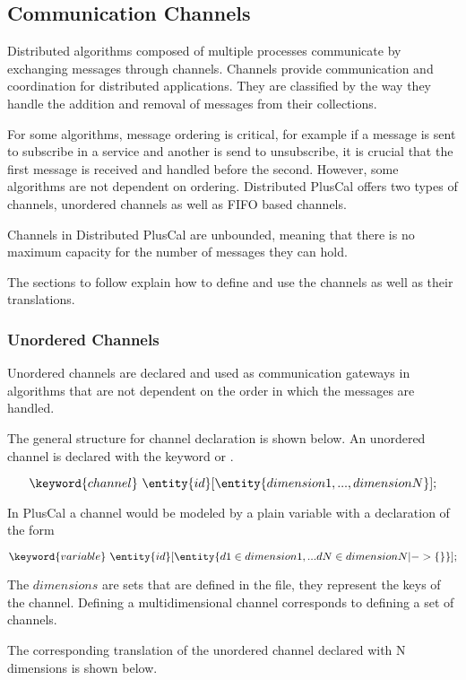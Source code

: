 \FloatBarrier
\subsection{Communication Channels}
\label{comChannels}

Distributed algorithms composed of multiple processes communicate by exchanging messages through channels. Channels provide communication and coordination for distributed applications. They are classified by the way they handle the addition and removal of messages from their collections. 

For some algorithms, message ordering is critical, for example if a message is sent to subscribe in a service and another is send to unsubscribe, it is crucial that the first message is received and handled before the second. However, some algorithms are not dependent on ordering. Distributed PlusCal offers two types of channels, unordered channels as well as FIFO based channels.

Channels in Distributed PlusCal are unbounded, meaning that there is no maximum capacity for the number of messages they can hold.

The sections to follow explain how to define and use the channels as well as their \tlaplus translations. 

\subsubsection{Unordered Channels}

Unordered channels are declared and used as communication gateways in algorithms that are not dependent on the order in which the messages are handled.

The general structure for channel declaration is shown below. An unordered channel is declared with the keyword  or . 

\[
 \keyword{channel}\ \entity{id}[\entity{dimension1,...,dimensionN}];
\]

In PlusCal a channel would be modeled by a plain variable with a declaration of the form

\[
 \keyword{variable}\ \entity{id}[\entity{d1 \in dimension1,... dN
  \in dimensionN |-> \{\}}];
\]

The $dimensions$ are \tlaplus sets that are defined in the \tlaplus file, they represent the keys of the channel. Defining a multidimensional channel corresponds to defining a set of channels.

The corresponding \tlaplus translation of the unordered channel declared with N dimensions is shown below.

